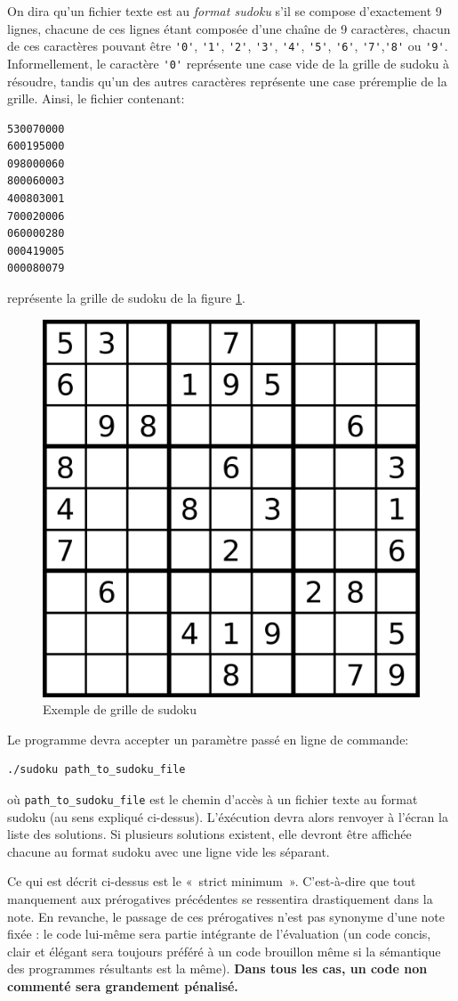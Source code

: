 \documentclass[french,a4paper]{article}
\theoremstyle{definition}
\theoremstyle{remark}
\newcommand{\shell}[1]{\lstinline[style={},style=sh]|#1|}
\newcommand{\inlinec}[1]{\lstinline[style=C]°#1°}
\begin{document}
\medskip

On dira qu'un fichier texte est au {\em format sudoku} s'il se compose
d'exactement 9 lignes, chacune de ces lignes étant composée d'une
chaîne de 9 caractères, chacun de ces caractères pouvant être
\inlinec{'0'}, \inlinec{'1'}, \inlinec{'2'}, \inlinec{'3'},
\inlinec{'4'}, \inlinec{'5'}, \inlinec{'6'},
\inlinec{'7'},\inlinec{'8'} ou \inlinec{'9'}. Informellement, le
caractère \inlinec{'0'} représente une case vide de la grille de
sudoku à résoudre, tandis qu'un des autres caractères représente une
case préremplie de la grille. Ainsi, le fichier contenant:
\begin{lstlisting}[style={},style=sh]
530070000 
600195000
098000060
800060003
400803001
700020006
060000280
000419005
000080079
\end{lstlisting}
représente la grille de sudoku de la figure \ref{fig:ex-sudoku}.
\begin{figure}[h!]
  \centering%
  \includegraphics[width=.5\textwidth]{ex-sudoku.png}
  \caption{Exemple de grille de sudoku}%
  \label{fig:ex-sudoku}%
\end{figure}

Le programme devra accepter un paramètre passé en ligne de commande:
\begin{lstlisting}[style={},style=sh]
./sudoku path_to_sudoku_file
\end{lstlisting}
où \shell{path_to_sudoku_file} est le chemin d'accès à un fichier
texte au format sudoku (au sens expliqué ci-dessus). L'éxécution devra
alors renvoyer à l'écran la liste des solutions. Si plusieurs
solutions existent, elle devront être affichée chacune au format
sudoku avec une ligne vide les séparant.

\medskip

Ce qui est décrit ci-dessus est le «~strict minimum~». C'est-à-dire
que tout manquement aux prérogatives précédentes se ressentira
drastiquement dans la note. En revanche, le passage de ces
prérogatives n'est pas synonyme d'une note fixée : le code lui-même
sera partie intégrante de l'évaluation (un code concis, clair et
élégant sera toujours préféré à un code brouillon même si la
sémantique des programmes résultants est la même). {\bf Dans tous les
  cas, un code non commenté sera grandement pénalisé.}
\end{document}
